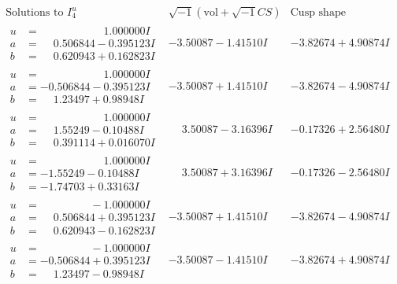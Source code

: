 \documentclass[1p]{elsarticle_modified}
\theoremstyle{definition}
\newcommand{\I}{\sqrt{-1}}
\begin{document}
$$\begin{array}{c|c|c}  
\text{Solutions to }I^u_{4}& \I (\text{vol} + \sqrt{-1}CS) & \text{Cusp shape}\\
 \hline 
\begin{aligned}
u &= \phantom{-0.000000 -}1.000000 I \\
a &= \phantom{-}0.506844 - 0.395123 I \\
b &= \phantom{-}0.620943 + 0.162823 I\end{aligned}
 & -3.50087 - 1.41510 I & -3.82674 + 4.90874 I \\ \hline\begin{aligned}
u &= \phantom{-0.000000 -}1.000000 I \\
a &= -0.506844 - 0.395123 I \\
b &= \phantom{-}1.23497 + 0.98948 I\end{aligned}
 & -3.50087 + 1.41510 I & -3.82674 - 4.90874 I \\ \hline\begin{aligned}
u &= \phantom{-0.000000 -}1.000000 I \\
a &= \phantom{-}1.55249 - 0.10488 I \\
b &= \phantom{-}0.391114 + 0.016070 I\end{aligned}
 & \phantom{-}3.50087 - 3.16396 I & -0.17326 + 2.56480 I \\ \hline\begin{aligned}
u &= \phantom{-0.000000 -}1.000000 I \\
a &= -1.55249 - 0.10488 I \\
b &= -1.74703 + 0.33163 I\end{aligned}
 & \phantom{-}3.50087 + 3.16396 I & -0.17326 - 2.56480 I \\ \hline\begin{aligned}
u &= \phantom{-0.000000 } -1.000000 I \\
a &= \phantom{-}0.506844 + 0.395123 I \\
b &= \phantom{-}0.620943 - 0.162823 I\end{aligned}
 & -3.50087 + 1.41510 I & -3.82674 - 4.90874 I \\ \hline\begin{aligned}
u &= \phantom{-0.000000 } -1.000000 I \\
a &= -0.506844 + 0.395123 I \\
b &= \phantom{-}1.23497 - 0.98948 I\end{aligned}
 & -3.50087 - 1.41510 I & -3.82674 + 4.90874 I \\ \hline\begin{aligned}

\end{aligned}
\end{array}$$
\end{document}
